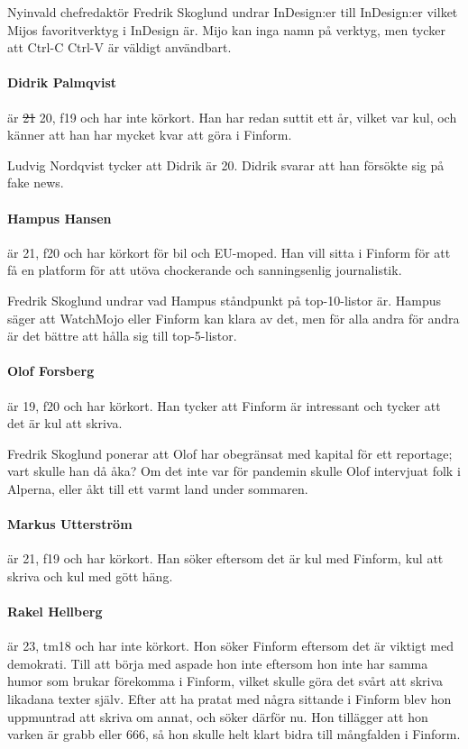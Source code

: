 \documentclass[hidelinks]{sektionsmote}
\begin{document}
Nyinvald chefredaktör Fredrik Skoglund undrar InDesign:er till InDesign:er vilket Mijos favoritverktyg i InDesign är.
Mijo kan inga namn på verktyg, men tycker att Ctrl-C Ctrl-V är väldigt användbart.

\paragraph{Didrik Palmqvist} är \sout{21} 20, f19 och har inte körkort.
Han har redan suttit ett år, vilket var kul, och känner att han har mycket kvar att göra i Finform.

Ludvig Nordqvist tycker att Didrik är 20.
Didrik svarar att han försökte sig på fake news.

\paragraph{Hampus Hansen} är 21, f20 och har körkort för bil och EU-moped.
Han vill sitta i Finform för att få en platform för att utöva chockerande och sanningsenlig journalistik.

Fredrik Skoglund undrar vad Hampus ståndpunkt på top-10-listor är.
Hampus säger att WatchMojo eller Finform kan klara av det, men för alla andra för andra är det bättre att hålla sig till top-5-listor.

\paragraph{Olof Forsberg} är 19, f20 och har körkort.
Han tycker att Finform är intressant och tycker att det är kul att skriva.

Fredrik Skoglund ponerar att Olof har obegränsat med kapital för ett reportage; vart skulle han då åka?
Om det inte var för pandemin skulle Olof intervjuat folk i Alperna, eller åkt till ett varmt land under sommaren.

\paragraph{Markus Utterström} är 21, f19 och har körkort.
Han söker eftersom det är kul med Finform, kul att skriva och kul med gött häng.

\paragraph{Rakel Hellberg} är 23, tm18 och har inte körkort.
Hon söker Finform eftersom det är viktigt med demokrati.
Till att börja med aspade hon inte eftersom hon inte har samma humor som brukar förekomma i Finform, vilket skulle göra det svårt att skriva likadana texter själv.
Efter att ha pratat med några sittande i Finform blev hon uppmuntrad att skriva om annat, och söker därför nu.
Hon tillägger att hon varken är grabb eller 666, så hon skulle helt klart bidra till mångfalden i Finform.
\end{document}
